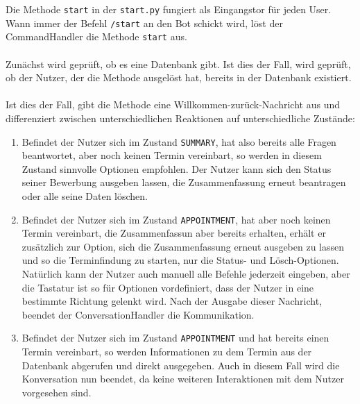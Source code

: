             Die Methode \verb|start| in der \verb|start.py| fungiert als Eingangstor für jeden User. Wann immer der Befehl \verb|/start| an den Bot schickt wird, löst der CommandHandler die Methode \verb|start| aus.\\
            \\
            Zunächst wird geprüft, ob es eine Datenbank gibt. Ist dies der Fall, wird geprüft, ob der Nutzer, der die Methode ausgelöst hat, bereits in der Datenbank existiert. \\
            \\
            Ist dies der Fall, gibt die Methode eine Willkommen-zurück-Nachricht aus und differenziert zwischen unterschiedlichen Reaktionen auf unterschiedliche Zustände:
            \begin{enumerate}
                \item Befindet der Nutzer sich im Zustand \verb|SUMMARY|, hat also bereits alle Fragen beantwortet, aber noch keinen Termin vereinbart, so werden in diesem Zustand sinnvolle Optionen empfohlen. Der Nutzer kann sich den Status seiner Bewerbung ausgeben lassen, die Zusammenfassung erneut beantragen oder alle seine Daten löschen.
                \item Befindet der Nutzer sich im Zustand \verb|APPOINTMENT|, hat aber noch keinen Termin vereinbart, die Zusammenfassun aber bereits erhalten, erhält er zusätzlich zur Option, sich die Zusammenfassung erneut ausgeben zu lassen und so die Terminfindung zu starten, nur die Status- und Lösch-Optionen. Natürlich kann der Nutzer auch manuell alle Befehle jederzeit eingeben, aber die Tastatur ist so für Optionen vordefiniert, dass der Nutzer in eine bestimmte Richtung gelenkt wird. Nach der Ausgabe dieser Nachricht, beendet der ConversationHandler die Kommunikation.
                \item Befindet der Nutzer sich im Zustand \verb|APPOINTMENT| und hat bereits einen Termin vereinbart, so werden Informationen zu dem Termin aus der Datenbank abgerufen und direkt ausgegeben. Auch in diesem Fall wird die Konversation nun beendet, da keine weiteren Interaktionen mit dem Nutzer vorgesehen sind.
            \end{enumerate}

